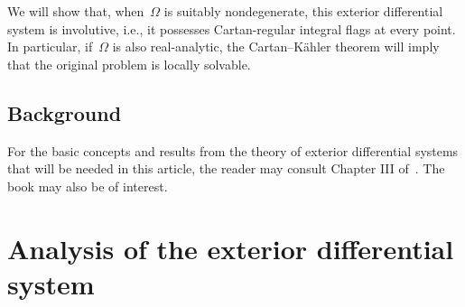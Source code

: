 \documentclass[pdftex]{sigma}
\numberwithin{equation}{section}
\begin{document}
We will show that, when~$\Omega$ is suitably nondegenerate,
this exterior differential system is involutive, i.e.,
it possesses Cartan-regular integral flags at every point.
In particular, if~$\Omega$ is also real-analytic,
the Cartan--K\"ahler theorem will imply that the original problem
is locally solvable.

\subsection{Background}
For the basic concepts and results
from the theory of exterior differential systems
that will be needed in this article,
the reader may consult Chapter III of~\cite{BCGGG}. The book \cite{CFB} may also be of interest.

\section{Analysis of the exterior differential system}\label{EDS-sec}
\end{document}
